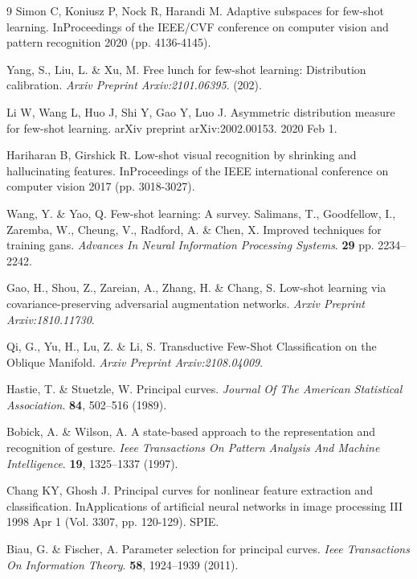 \documentclass[preprint,12pt,number]{elsarticle}
\begin{document}
\begin{thebibliography}{9}
Simon C, Koniusz P, Nock R, Harandi M. Adaptive subspaces for few-shot learning. InProceedings of the IEEE/CVF conference on computer vision and pattern recognition 2020 (pp. 4136-4145).

Yang, S., Liu, L. \& Xu, M. Free lunch for few-shot learning: Distribution calibration. 
{\em Arxiv Preprint Arxiv:2101.06395}.
 (202).
 
Li W, Wang L, Huo J, Shi Y, Gao Y, Luo J. Asymmetric distribution measure for few-shot learning. arXiv preprint arXiv:2002.00153. 2020 Feb 1.

Hariharan B, Girshick R. Low-shot visual recognition by shrinking and hallucinating features. InProceedings of the IEEE international conference on computer vision 2017 (pp. 3018-3027).

Wang, Y. \& Yao, Q. Few-shot learning: A survey. 
Salimans, T., Goodfellow, I., Zaremba, W., Cheung, V., Radford, A. \& Chen, X. Improved techniques for training gans. 
{\em Advances In Neural Information Processing Systems}.
 \textbf{29} pp. 2234--2242.
 
Gao, H., Shou, Z., Zareian, A., Zhang, H. \& Chang, S. Low-shot learning via covariance-preserving adversarial augmentation networks. 
{\em Arxiv Preprint Arxiv:1810.11730}.
 
Qi, G., Yu, H., Lu, Z. \& Li, S. Transductive Few-Shot Classification on the Oblique Manifold. 
{\em Arxiv Preprint Arxiv:2108.04009}.

Hastie, T. \& Stuetzle, W. Principal curves. 
{\em Journal Of The American Statistical Association}.
 \textbf{84}, 502--516 (1989).
 
Bobick, A. \& Wilson, A. A state-based approach to the representation and recognition of gesture. 
{\em Ieee Transactions On Pattern Analysis And Machine Intelligence}.
 \textbf{19}, 1325--1337 (1997).
 
Chang KY, Ghosh J. Principal curves for nonlinear feature extraction and classification. InApplications of artificial neural networks in image processing III 1998 Apr 1 (Vol. 3307, pp. 120-129). SPIE.

Biau, G. \& Fischer, A. Parameter selection for principal curves. 
{\em Ieee Transactions On Information Theory}.
 \textbf{58}, 1924--1939 (2011).
 

\end{thebibliography}
\end{document}
